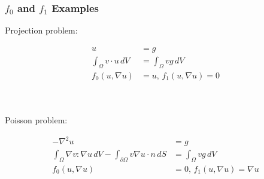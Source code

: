 \documentclass{beamer}
\begin{document}

\begin{frame}
\begin{center}
\frametitle{$f_0$ and $f_1$ Examples}

Projection problem:

\vspace{-10px}

\begin{equation*}
\begin{split}
u &= g\\
\int_\Omega v \cdot u \, dV &= \int_\Omega v g \, dV\\
f_0 \left( u, \nabla u \right) &= u,\, f_1 \left( u, \nabla u \right) = 0
\end{split}
\end{equation*}

~\\

~\\

Poisson problem:

\vspace{-10px}

\begin{equation*}
\begin{split}
-\nabla^2 u &= g\\
\int_\Omega \nabla v : \nabla u \, dV - \int_{\partial \Omega} v \nabla u \cdot n \, dS &= \int_\Omega v g \, dV \\
f_0 \left( u, \nabla u \right) &= 0,\, f_1 \left( u, \nabla u \right) = \nabla u
\end{split}
\end{equation*}


\end{center}
\end{frame}

\end{document}
